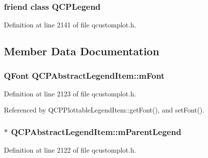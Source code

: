 \subsubsection[{Q\+C\+P\+Legend}]{\setlength{\rightskip}{0pt plus 5cm}friend class {\bf Q\+C\+P\+Legend}\hspace{0.3cm}{\ttfamily [friend]}}\label{class_q_c_p_abstract_legend_item_a8429035e7adfbd7f05805a6530ad5e3b}


Definition at line 2141 of file qcustomplot.\+h.



\subsection{Member Data Documentation}
\hypertarget{class_q_c_p_abstract_legend_item_ae916a78ac0d2a60e20a17ca2f24f9754}{}
\subsubsection[{m\+Font}]{\setlength{\rightskip}{0pt plus 5cm}Q\+Font Q\+C\+P\+Abstract\+Legend\+Item\+::m\+Font\hspace{0.3cm}{\ttfamily [protected]}}\label{class_q_c_p_abstract_legend_item_ae916a78ac0d2a60e20a17ca2f24f9754}


Definition at line 2123 of file qcustomplot.\+h.



Referenced by Q\+C\+P\+Plottable\+Legend\+Item\+::get\+Font(), and set\+Font().

\hypertarget{class_q_c_p_abstract_legend_item_aafcd9fc6fcb10f4a8d46037011afafe8}{}
\subsubsection[{m\+Parent\+Legend}]{$\ast$ Q\+C\+P\+Abstract\+Legend\+Item\+::m\+Parent\+Legend\hspace{0.3cm}{\ttfamily [protected]}}\label{class_q_c_p_abstract_legend_item_aafcd9fc6fcb10f4a8d46037011afafe8}


Definition at line 2122 of file qcustomplot.\+h.



